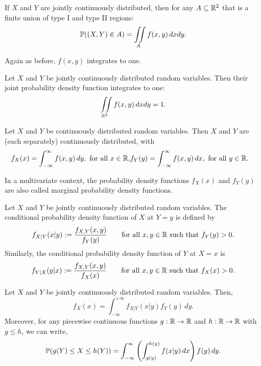 \documentclass[10pt, a4paper]{article}
\begin{document}
\begin{theorem}
    If $X$ and $Y$ are jointly continuously distributed,
    then for any $A \subseteq \R ^ 2$ that is a finite union of type I and type II regions:
    \[
    \P((X, Y) \in A) = \iint\limits_{A}f(x, y)\,dxdy.
    \]
\end{theorem}
Again as before,
$f(x, y)$ integrates to one.
\begin{corollary}
    Let $X$ and $Y$ be jointly continuously distributed random variables.
    Then their joint probability density function integrates to one:
    \[
    \iint\limits_{\R ^ 2}f(x, y)\,dxdy = 1.
    \]
\end{corollary}

\begin{corollary}
    Let $X$ and $Y$ be continuously distributed random variables.
    Then $X$ and $Y$ are
    (each separately)
    continuously distributed,
    with
    \begin{align*}
    f_X(x) = \int_{-\infty}^{\infty}f(x, y)\,dy, \text{ for all } x \in \R, &f_Y(y) = \int_{-\infty}^{\infty}f(x, y)\,dx, \text{ for all } y \in \R.
    \end{align*}
\end{corollary}

In a multivariate context,
the probability density functions $f_X(x)$ and $f_Y(y)$ are also called marginal probability density functions.

\begin{definition}
    Let $X$ and $Y$ be jointly continuously distributed random variables.
    The conditional probability density function of $X$ at $Y = y$ is defined by
    \[
    f_{X|Y}(x | y) := \frac{f_{X, Y}(x, y)}{f_Y(y)}\qquad\text{for all $x, y \in \R$ such that $f_Y(y) > 0$}.
    \]
    Similarly,
    the conditional probability density function of $Y$ at $X = x$ is
    \[
    f_{Y|X}(y | x) := \frac{f_{X, Y}(x, y)}{f_X(x)}\qquad\text{for all $x, y \in \R$ such that $f_X(x) > 0$}.
    \]
\end{definition}

\begin{theorem}
    Let $X$ and $Y$ be jointly continuously distributed random variables.
    Then,
    \[
    f_X(x) = \int_{-\infty}^{+\infty}f_{X|Y}(x | y)f_Y(y)\,dy.
    \]
    Moreover,
    for any piecewise continuous functions $g : \R \rightarrow \R$ and $h : \R \rightarrow \R$ with $g \leq h$,
    we can write,
    \[
    \P(g(Y) \leq X \leq h(Y)) = \int_{-\infty}^{\infty}\left(\int_{g(y)}^{h(y)}f(x | y)\,dx\right)f(y)\,dy.
    \]
\end{theorem}
\end{document}
